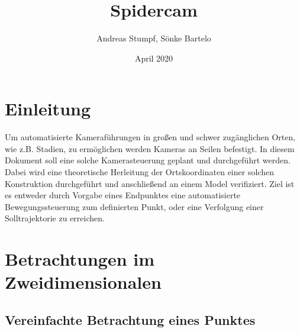 \documentclass[a4paper, 12pt]{article}
\title{Spidercam}
\date{April 2020}
\author{Andreas Stumpf, Sönke Bartelo}
\begin{document}
	\maketitle
	\newpage
	\tableofcontents
	\pagebreak
	\listoffigures
	\pagebreak
	\section{Einleitung}
	Um automatisierte Kameraführungen in großen und schwer zugänglichen Orten, wie z.B. Stadien, zu ermöglichen werden Kameras an Seilen befestigt.
	In diesem Dokument soll eine solche Kamerasteuerung geplant und durchgeführt werden.
	Dabei wird eine theoretische Herleitung der Ortskoordinaten einer solchen Konstruktion durchgeführt und anschließend an einem Model verifiziert.
	Ziel ist es entweder durch Vorgabe eines Endpunktes eine automatisierte Bewegungssteuerung zum definierten Punkt, oder eine Verfolgung einer Solltrajektorie zu erreichen.
	\pagebreak
	\section{Betrachtungen im Zweidimensionalen}
		\subsection{Vereinfachte Betrachtung eines Punktes}
\end{document}
